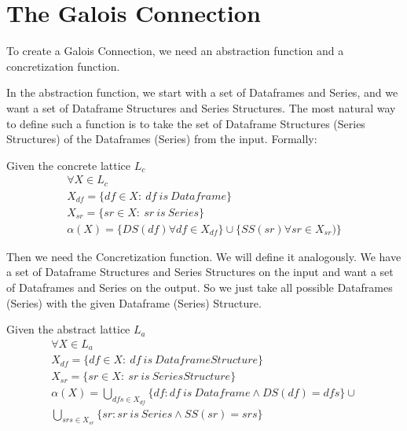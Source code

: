 \section{The Galois Connection}

To create a Galois Connection, we need an abstraction function and a concretization function.

In the abstraction function, we start with a set of Dataframes and Series, and we want a set of Dataframe Structures and
Series Structures.
The most natural way to define such a function is to take the set of Dataframe Structures (Series Structures) of the
Dataframes (Series) from the input.
Formally:

\begin{defn}
    Given the concrete lattice $L_c$
    \begin{gather*}
        \forall X \in L_c \\
        X_{df} = \{df \in X: \: df \: is \: Dataframe\} \\
        X_{sr} = \{sr \in X: \: sr \: is \: Series\} \\
        \alpha(X) = \{DS(df) \forall df \in X_{df}\} \cup \{SS(sr) \forall sr \in X_{sr})\}
    \end{gather*}
\end{defn}

Then we need the Concretization function.
We will define it analogously.
We have a set of Dataframe Structures and Series Structures on the input and want a set of Dataframes and Series
on the output.
So we just take all possible Dataframes (Series) with the given Dataframe (Series) Structure.

\begin{defn}
    Given the abstract lattice $L_a$
    \begin{gather*}
        \forall X \in L_a \\
        X_{df} = \{df \in X: \: df \: is \: Dataframe Structure\} \\
        X_{sr} = \{sr \in X: \: sr \: is \: Series Structure\} \\
        \alpha(X) =
        \bigcup_{dfs \in X_{df}}  \{df: df \: is \: Dataframe \land DS(df) = dfs\}
        \cup \\
        \bigcup_{srs \in X_{sr}} \{sr: sr \: is \: Series \land SS(sr) = srs\}
    \end{gather*}
\end{defn}


